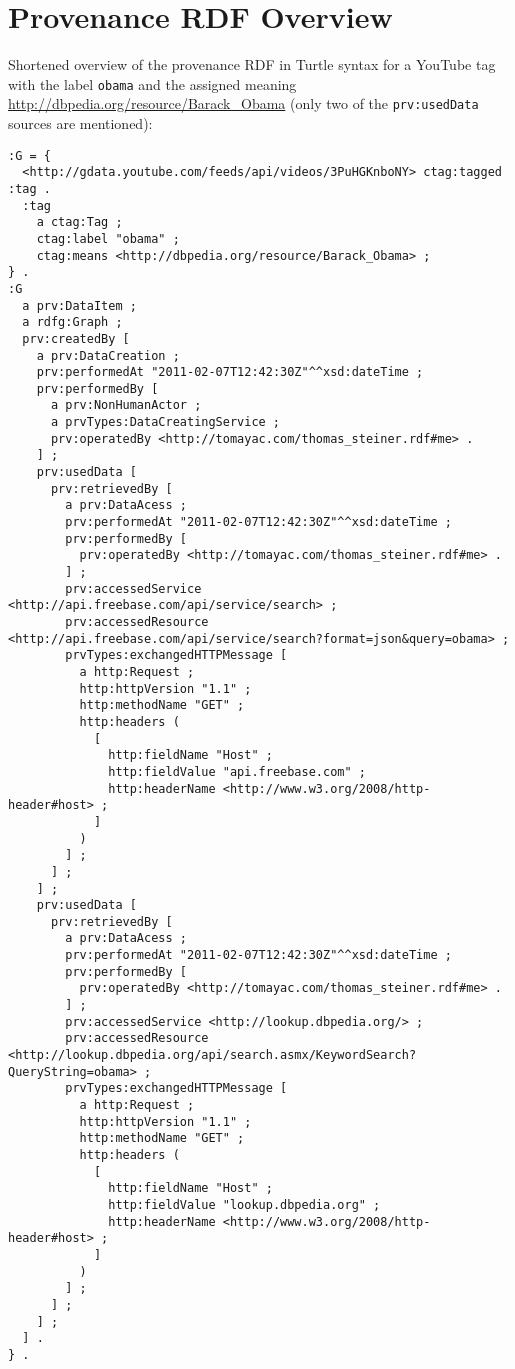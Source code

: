 \documentclass{acm_proc_article-sp}
\begin{document}
\section{Provenance RDF Overview}\label{sec:appendix}
Shortened overview of the provenance RDF in Turtle syntax for a YouTube tag with the label \texttt{obama} and the assigned meaning \url{http://dbpedia.org/resource/Barack_Obama} (only two of the \texttt{prv:usedData} sources are mentioned):
\begin{verbatim}
:G = {
  <http://gdata.youtube.com/feeds/api/videos/3PuHGKnboNY> ctag:tagged :tag .
  :tag
    a ctag:Tag ;
    ctag:label "obama" ;
    ctag:means <http://dbpedia.org/resource/Barack_Obama> ;
} .
:G
  a prv:DataItem ;
  a rdfg:Graph ;
  prv:createdBy [
    a prv:DataCreation ;
    prv:performedAt "2011-02-07T12:42:30Z"^^xsd:dateTime ;
    prv:performedBy [
      a prv:NonHumanActor ;
      a prvTypes:DataCreatingService ;
      prv:operatedBy <http://tomayac.com/thomas_steiner.rdf#me> .
    ] ;
    prv:usedData [
      prv:retrievedBy [
        a prv:DataAcess ;
        prv:performedAt "2011-02-07T12:42:30Z"^^xsd:dateTime ;
        prv:performedBy [
          prv:operatedBy <http://tomayac.com/thomas_steiner.rdf#me> .
        ] ;
        prv:accessedService <http://api.freebase.com/api/service/search> ;
        prv:accessedResource <http://api.freebase.com/api/service/search?format=json&query=obama> ;
        prvTypes:exchangedHTTPMessage [
          a http:Request ;
          http:httpVersion "1.1" ;
          http:methodName "GET" ;
          http:headers (
            [
              http:fieldName "Host" ;
              http:fieldValue "api.freebase.com" ;
              http:headerName <http://www.w3.org/2008/http-header#host> ;
            ]
          )
        ] ;
      ] ;
    ] ;
    prv:usedData [
      prv:retrievedBy [
        a prv:DataAcess ;
        prv:performedAt "2011-02-07T12:42:30Z"^^xsd:dateTime ;
        prv:performedBy [
          prv:operatedBy <http://tomayac.com/thomas_steiner.rdf#me> .
        ] ;
        prv:accessedService <http://lookup.dbpedia.org/> ;
        prv:accessedResource <http://lookup.dbpedia.org/api/search.asmx/KeywordSearch?QueryString=obama> ;
        prvTypes:exchangedHTTPMessage [
          a http:Request ;
          http:httpVersion "1.1" ;
          http:methodName "GET" ;
          http:headers (
            [
              http:fieldName "Host" ;
              http:fieldValue "lookup.dbpedia.org" ;
              http:headerName <http://www.w3.org/2008/http-header#host> ;
            ]
          )
        ] ;
      ] ;
    ] ;
  ] .
} .
\end{verbatim}

\balancecolumns
\end{document}
